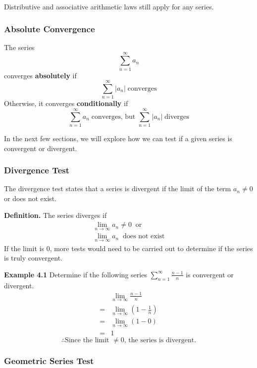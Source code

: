 \documentclass[12pt]{article}
\begin{document}
Distributive and associative arithmetic laws still apply for any series.

\subsubsection{Absolute Convergence}

The series
\[
	\displaystyle\sum_{n=1}^{\infty}a_n
\]
converges \textbf{absolutely} if
\[
	\displaystyle\sum_{n=1}^{\infty}|a_n| \; \text{converges}
\]
Otherwise, it converges \textbf{conditionally} if
\[
	\displaystyle\sum_{n=1}^{\infty}a_n \; \text{converges, but } \displaystyle\sum_{n=1}^{\infty}|a_n| \; \text{diverges}
\]

In the next few sections, we will explore how we can test if a given series is convergent or divergent.

\subsubsection{Divergence Test}

The divergence test states that a series is divergent if the limit of the term $a_n \neq 0$ or does not exist.

\textbf{Definition.} The series diverges if
\begin{gather*}
	\displaystyle\lim_{n\rightarrow\infty}a_n \neq 0  \;\;  \text{or}  \\
	\displaystyle\lim_{n\rightarrow\infty}a_n \;\; \text{does not exist}
\end{gather*}
If the limit is $0$, more tests would need to be carried out to determine if the series is truly convergent.

\textbf{Example 4.1} Determine if the following series $\displaystyle\sum_{n=1}^{\infty}\frac{n - 1}{n}$ is convergent or divergent.
\begin{align*}
	  & \displaystyle\lim_{n\rightarrow\infty}\frac{n - 1}{n}   \\
	= & \displaystyle\lim_{n\rightarrow\infty}(1 - \frac{1}{n}) \\
	= & \displaystyle\lim_{n\rightarrow\infty}(1 - 0)           \\
	= & 1
\end{align*}
\[
	\therefore \text{Since the limit $\neq 0$, the series is divergent}.
\]

\subsubsection{Geometric Series Test}
\end{document}
